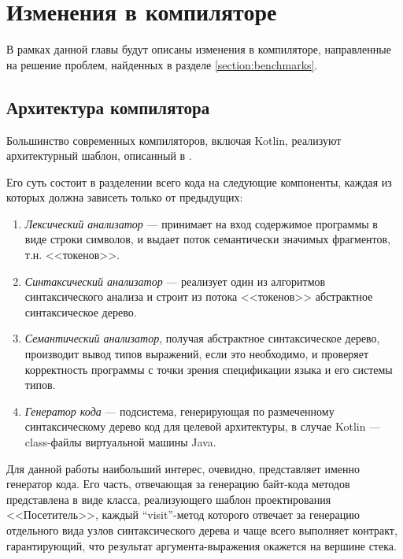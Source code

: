 \section{Изменения в компиляторе}
В рамках данной главы будут описаны изменения в компиляторе, направленные на решение проблем,
найденных в разделе \ref{section:benchmarks}.

\subsection{Архитектура компилятора}
Большинство современных компиляторов, включая Kotlin, реализуют архитектурный шаблон, описанный
в \cite{Muchnick}.

Его суть состоит в разделении всего кода на следующие компоненты, каждая из которых должна зависеть
только от предыдущих:
\begin{enumerate}
    \item \textit{Лексический анализатор} --- принимает на вход содержимое программы в виде строки
    символов, и выдает поток семантически значимых фрагментов, т.н. <<токенов>>.

    \item \textit{Синтаксический анализатор} --- реализует один из алгоритмов синтаксического
    анализа и строит из потока <<токенов>> абстрактное синтаксическое дерево.

    \item \textit{Семантический анализатор}, получая абстрактное синтаксическое дерево, производит
    вывод типов выражений, если это необходимо, и проверяет корректность программы с точки зрения
    спецификации языка и его системы типов.

    \item \textit{Генератор кода} --- подсистема, генерирующая по размеченному синтаксическому
    дерево код для целевой архитектуры, в случае Kotlin --- class-файлы виртуальной машины Java.
\end{enumerate}

Для данной работы наибольший интерес, очевидно, представляет именно генератор кода.
Его часть, отвечающая за генерацию байт-кода методов представлена в виде класса, реализующего
шаблон проектирования <<Посетитель>>\cite{Gamma}, каждый ``visit''-метод которого отвечает за
генерацию отдельного вида узлов синтаксического дерева и чаще всего выполняет контракт,
гарантирующий, что результат аргумента-выражения окажется на вершине стека.

